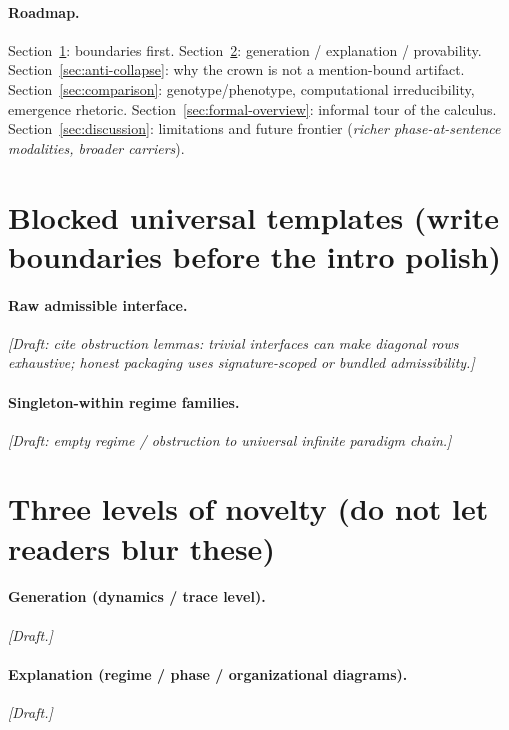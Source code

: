 \documentclass[11pt,a4paper]{article}
\theoremstyle{definition}
\begin{document}
\paragraph{Roadmap.}
Section~\ref{sec:blocked-universals}: boundaries first.
Section~\ref{sec:three-levels}: generation / explanation / provability.
Section~\ref{sec:anti-collapse}: why the crown is not a mention-bound artifact.
Section~\ref{sec:comparison}: genotype/phenotype, computational irreducibility, emergence rhetoric.
Section~\ref{sec:formal-overview}: informal tour of the calculus.
Section~\ref{sec:discussion}: limitations and future frontier (\emph{richer phase-at-sentence modalities, broader carriers}).

\section{Blocked universal templates (write boundaries before the intro polish)}\label{sec:blocked-universals}

\paragraph{Raw admissible interface.}
\emph{[Draft: cite obstruction lemmas: trivial interfaces can make diagonal rows exhaustive; honest packaging uses signature-scoped or bundled admissibility.]}

\paragraph{Singleton-within regime families.}
\emph{[Draft: empty regime / obstruction to universal infinite paradigm chain.]}

\section{Three levels of novelty (do not let readers blur these)}\label{sec:three-levels}

\paragraph{Generation (dynamics / trace level).}
\emph{[Draft.]}

\paragraph{Explanation (regime / phase / organizational diagrams).}
\emph{[Draft.]}
\end{document}
